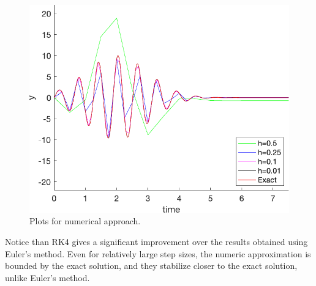 \begin{figure}[H]
    \centering
    \includegraphics[scale=0.5]{files/example3Kutta.pdf}
    \caption{Plots for numerical approach.}
    \label{fig:ex3kutta}
\end{figure}

Notice than RK4 gives a significant improvement over the results obtained using Euler's method. Even for relatively large step sizes, the numeric approximation is bounded by the exact solution, and they stabilize closer to the exact solution, unlike Euler's method.
